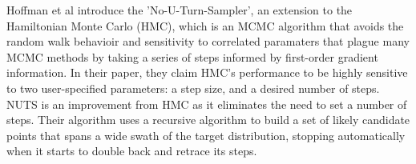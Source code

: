 Hoffman et al introduce the 'No-U-Turn-Sampler', an extension to the Hamiltonian Monte Carlo (HMC), which is an MCMC algorithm that avoids the random walk behavioir and sensitivity to correlated paramaters that plague many MCMC methods by taking a series of steps informed by first-order gradient information.\cite{Matthew-D.-Hoffman:2014aa} In their paper, they claim HMC’s performance to be highly sensitive to two user-specified parameters: a step size, and a desired number of steps. NUTS is an improvement from HMC as it eliminates the need to set a number of steps. Their algorithm uses a recursive algorithm to build a set of likely candidate points that spans a wide swath of the target distribution, stopping automatically when it starts to double back and retrace its steps.
